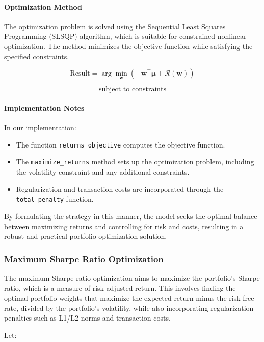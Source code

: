 \paragraph{Optimization Method}

The optimization problem is solved using the Sequential Least Squares Programming (SLSQP) algorithm, which is suitable for constrained nonlinear optimization. The method minimizes the objective function while satisfying the specified constraints.

\[
\text{Result} = \arg\min_{\mathbf{w}} \left( -\mathbf{w}^\top \boldsymbol{\mu} + \mathcal{R}(\mathbf{w}) \right)
\]

\[
\text{subject to constraints}
\]

\paragraph{Implementation Notes}

In our implementation:

\begin{itemize}
    \item The function \texttt{returns\_objective} computes the objective function.
    \item The \texttt{maximize\_returns} method sets up the optimization problem, including the volatility constraint and any additional constraints.
    \item Regularization and transaction costs are incorporated through the \texttt{total\_penalty} function.
\end{itemize}

By formulating the strategy in this manner, the model seeks the optimal balance between maximizing returns and controlling for risk and costs, resulting in a robust and practical portfolio optimization solution.


\subsubsection{Maximum Sharpe Ratio Optimization}

The maximum Sharpe ratio optimization aims to maximize the portfolio's Sharpe ratio, which is a measure of risk-adjusted return. This involves finding the optimal portfolio weights that maximize the expected return minus the risk-free rate, divided by the portfolio's volatility, while also incorporating regularization penalties such as L1/L2 norms and transaction costs.

Let:

